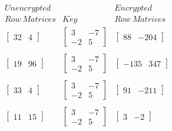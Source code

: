 \documentclass[10pt]{article}
\begin{document}
\begin{align*}\begin{array}{ccc}
Unencrypted & & Encrypted\\
Row~Matrices & Key & Row~Matrices\\
\left[ \begin{array}{cc}32 & 4\end{array}\right] &
\left[ \begin{array}{cc}3 & -7\\-2 & 5\end{array} \right] & \left[\begin{array}{cc}88 & -204\end{array}\right]\\
\\
\left[ \begin{array}{cc}19 & 96\end{array}\right] &
\left[ \begin{array}{cc}3 & -7\\-2 & 5\end{array} \right] & \left[\begin{array}{cc}-135 & 347\end{array}\right]\\
\\
\left[ \begin{array}{cc}33 & 4\end{array}\right] &
\left[ \begin{array}{cc}3 & -7\\-2 & 5\end{array} \right] & \left[\begin{array}{cc}91 & -211\end{array}\right]\\
\\
\left[ \begin{array}{cc}11 & 15\end{array}\right] &
\left[ \begin{array}{cc}3 & -7\\-2 & 5\end{array} \right] & \left[\begin{array}{cc}3 & -2\end{array}\right]\\
\end{array}
\end{align*}
\end{document}
